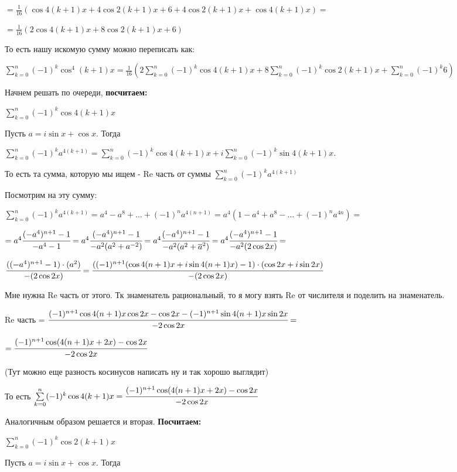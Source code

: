 \documentclass{article}
\begin{document}
$=\frac{1}{16}(\cos 4 (k+1)x + 4 \cos 2(k+1)x + 6 + 4 \cos 2(k+1)x+ \cos 4(k+1) x) = $

$= \frac{1}{16}(2 \cos 4(k+1)x + 8 \cos 2(k+1)x + 6)$

То есть нашу искомую сумму можно переписать как:

$\sum\limits_{k=0}^n  (-1)^k \cos^4 (k+1) x =\frac{1}{16} (2\sum\limits_{k=0}^n (-1)^k \cos 4(k+1)x + 8\sum\limits_{k=0}^n (-1)^k \cos 2(k+1)x + \sum\limits_{k=0}^n (-1)^k 6)$

Начнем решать по очереди, \textbf{посчитаем:}

$\sum\limits_{k=0}^n (-1)^k \cos 4(k+1)x$

Пусть $a = i\sin x + \cos x$. Тогда

$\sum\limits_{k=0}^n (-1)^k a^{4(k+1)}=\sum\limits_{k=0}^n (-1)^k\cos 4(k+1)x + i\sum\limits_{k=0}^n (-1)^k\sin 4(k+1)x$.

То есть та сумма, которую мы ищем - Re часть от суммы $\sum\limits_{k=0}^n (-1)^k a^{4(k+1)}$

Посмотрим на эту сумму:

$\sum\limits_{k=0}^n (-1)^k a^{4(k+1)} = a^4 - a^8 + \ldots + (-1)^n a^{4(n+1)} = a^4 (1-a^4+a^8-\ldots + (-1)^na^{4n}) = $

$=a^4 \cfrac{(-a^4)^{n+1}-1}{-a^4-1} =a^4 \cfrac{(-a^4)^{n+1}-1}{-a^2(a^2+a^{-2})} =a^4 \cfrac{(-a^4)^{n+1}-1}{-a^2(a^2+\overline{a}^{2})} = a^4 \cfrac{(-a^4)^{n+1}-1}{-a^2(2 \cos 2x)} = $

$\cfrac{((-a^4)^{n+1}-1)\cdot(a^2)}{-(2 \cos 2x)} = 
\cfrac{((-1)^{n+1}(\cos 4(n+1)x+i\sin4(n+1)x)-1)\cdot(\cos 2x +i\sin 2x)}{-(2 \cos 2x)} $

Мне нужна Re часть от этого. Тк знаменатель рациональный, то  я могу взять Re от числителя и поделить на знаменатель.

Re часть = $ \cfrac{(-1)^{n+1} \cos 4(n+1)x \cos 2x - \cos 2x - (-1)^{n+1} \sin 4(n+1)x \sin 2x}{-2\cos 2x} = $

$  = \cfrac{(-1)^{n+1} \cos (4(n+1)x+2x) - \cos 2x}{-2\cos 2x}$

(Тут можно еще разность косинусов написать ну и так хорошо выглядит)

То есть $\sum\limits_{k=0}^n (-1)^k \cos 4(k+1)x = \cfrac{(-1)^{n+1} \cos (4(n+1)x+2x) - \cos 2x}{-2\cos 2x}$

Аналогичным образом решается и вторая. \textbf{Посчитаем:}

$\sum\limits_{k=0}^n (-1)^k \cos 2(k+1)x$

Пусть $a = i\sin x + \cos x$. Тогда
\end{document}
